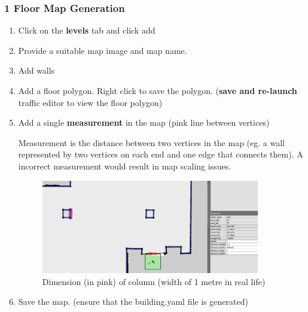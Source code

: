 \documentclass[11pt]{article}
\begin{document}
\subsubsection{1 Floor Map Generation}
\begin{enumerate}
 \item {Click on the \textbf{levels} tab and click add}
 \item {Provide a suitable map image and map name.}
 \item {Add walls}
 \item {Add a floor polygon. Right click to save the polygon. (\textbf{save and re-launch} traffic editor to view the floor polygon)}
 \item {
       Add a single \textbf{measurement} in the map (pink line between vertices)
       
       Measurement is the distance between two vertices in the map (eg. a wall represented by two vertices on each end and one edge that connects them). A incorrect measurement would result in map scaling issues.
       
       \begin{figure}[H]
        \centering
        \includegraphics[width=0.9\textwidth]{images/dimension}
        \caption{Dimension (in pink) of column (width of 1 metre in real life)}
       \end{figure}
       }
 \item {Save the map. (ensure that the building.yaml file is generated)}
\end{enumerate}
\end{document}
